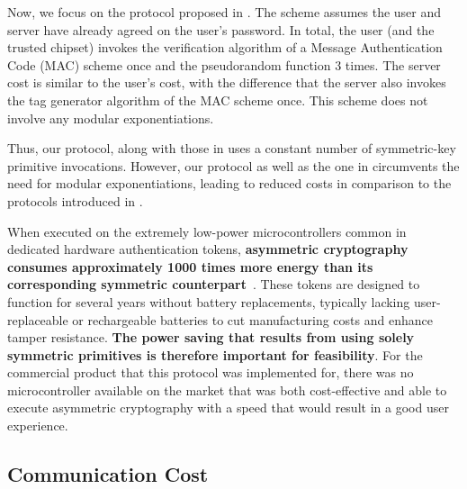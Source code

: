 Now, we focus on the protocol proposed in \cite{MatsuoMY11}. The scheme assumes the user and server have already agreed on the user's password. 
%
In total, the user (and the trusted chipset) invokes the verification algorithm of a Message Authentication Code (MAC) scheme once and the pseudorandom function $3$ times. The server cost is similar to the user's cost, with the difference that the server also invokes the tag generator algorithm of the MAC scheme once. This scheme does not involve any modular exponentiations. 

Thus,  our protocol, along with those in \cite{WangW18,JareckiJKSS21,MatsuoMY11} uses a constant number of symmetric-key primitive invocations. However, our protocol as well as the one in \cite{MatsuoMY11} circumvents the need for modular exponentiations, leading to reduced costs in comparison to the protocols introduced in  \cite{WangW18,JareckiJKSS21}.

When executed on the extremely low-power microcontrollers common in dedicated hardware authentication tokens, \textbf{asymmetric cryptography consumes approximately 1000 times more energy than its corresponding symmetric counterpart}~\cite{energyconsumption}. These tokens are designed to function for several years without battery replacements, typically lacking user-replaceable or rechargeable batteries to cut manufacturing costs and enhance tamper resistance. \textbf{The power saving that results from using solely symmetric primitives is therefore important for feasibility}. 
%
For the commercial product that this protocol was implemented for, there was no microcontroller available on the market that was both cost-effective and able to execute asymmetric cryptography with a speed that would result in a good user experience.







\subsection{Communication Cost}
\vspace{-.3mm}

